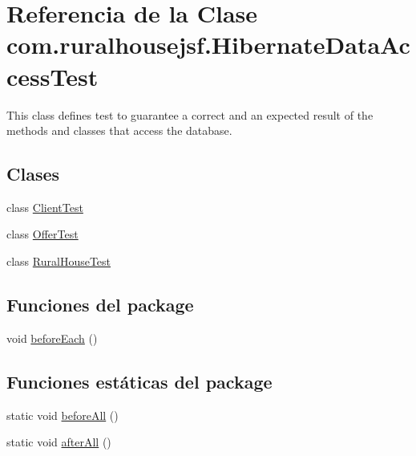 \hypertarget{classcom_1_1ruralhousejsf_1_1_hibernate_data_access_test}{}\section{Referencia de la Clase com.\+ruralhousejsf.\+Hibernate\+Data\+Access\+Test}
\label{classcom_1_1ruralhousejsf_1_1_hibernate_data_access_test}


This class defines test to guarantee a correct and an expected result of the methods and classes that access the database.  


\subsection*{Clases}
\begin{DoxyCompactItemize}
\item 
class \mbox{\hyperlink{classcom_1_1ruralhousejsf_1_1_hibernate_data_access_test_1_1_client_test}{Client\+Test}}
\item 
class \mbox{\hyperlink{classcom_1_1ruralhousejsf_1_1_hibernate_data_access_test_1_1_offer_test}{Offer\+Test}}
\item 
class \mbox{\hyperlink{classcom_1_1ruralhousejsf_1_1_hibernate_data_access_test_1_1_rural_house_test}{Rural\+House\+Test}}
\end{DoxyCompactItemize}
\subsection*{Funciones del \textquotesingle{}package\textquotesingle{}}
\begin{DoxyCompactItemize}
\item 
void \mbox{\hyperlink{classcom_1_1ruralhousejsf_1_1_hibernate_data_access_test_a45f50c1176ffaef90f33dccb27e03cdd}{before\+Each}} ()
\end{DoxyCompactItemize}
\subsection*{Funciones estáticas del \textquotesingle{}package\textquotesingle{}}
\begin{DoxyCompactItemize}
\item 
static void \mbox{\hyperlink{classcom_1_1ruralhousejsf_1_1_hibernate_data_access_test_a385a9a721138e301ab9b775298eff369}{before\+All}} ()
\item 
static void \mbox{\hyperlink{classcom_1_1ruralhousejsf_1_1_hibernate_data_access_test_ad178c485d2837875d915e6876d29862c}{after\+All}} ()
\end{DoxyCompactItemize}
